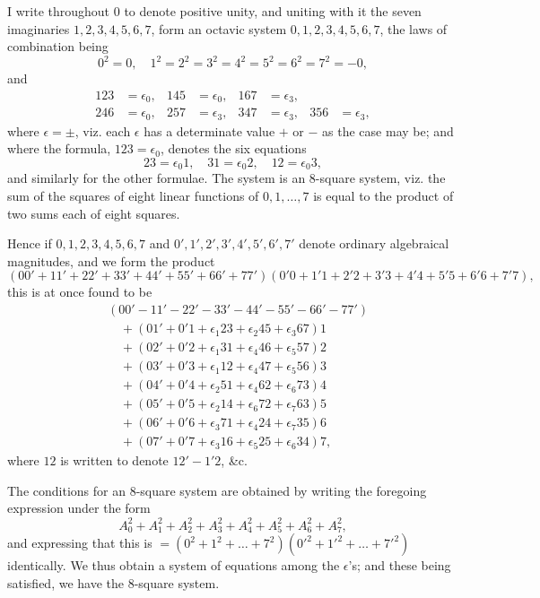 \documentclass[11pt,a4paper]{article}
\theoremstyle{definition}
\begin{document}
I write throughout $0$ to denote positive unity, and uniting with it the seven imaginaries $1, 2, 3, 4, 5, 6, 7$, form an octavic system $0, 1, 2, 3, 4, 5, 6, 7$, the laws of combination being
\[
0^2 = 0,\quad 1^2 = 2^2 = 3^2 = 4^2 = 5^2 = 6^2 = 7^2 = -0,
\]
and
\[
\begin{aligned}
123 &= \epsilon_0, & 145 &= \epsilon_0, & 167 &= \epsilon_3,\\
246 &= \epsilon_0, & 257 &= \epsilon_3, & 347 &= \epsilon_3, & 356 &= \epsilon_3,
\end{aligned}
\]
where $\epsilon = \pm$, viz. each $\epsilon$ has a determinate value $+$ or $-$ as the case may be; and where the formula, $123 = \epsilon_0$, denotes the six equations
\[
23 = \epsilon_0 1,\quad 31 = \epsilon_0 2,\quad 12 = \epsilon_0 3,
\]
and similarly for the other formulae. The system is an 8-square system, viz. the sum of the squares of eight linear functions of $0, 1, \dots, 7$ is equal to the product of two sums each of eight squares.

Hence if $0, 1, 2, 3, 4, 5, 6, 7$ and $0', 1', 2', 3', 4', 5', 6', 7'$ denote ordinary algebraical magnitudes, and we form the product
\[
(00' + 11' + 22' + 33' + 44' + 55' + 66' + 77')(0'0 + 1'1 + 2'2 + 3'3 + 4'4 + 5'5 + 6'6 + 7'7),
\]
this is at once found to be
\[
\begin{aligned}
&(00' - 11' - 22' - 33' - 44' - 55' - 66' - 77')\\
&\quad + (01' + 0'1 + \epsilon_1 23 + \epsilon_2 45 + \epsilon_3 67)1\\
&\quad + (02' + 0'2 + \epsilon_1 31 + \epsilon_4 46 + \epsilon_5 57)2\\
&\quad + (03' + 0'3 + \epsilon_1 12 + \epsilon_4 47 + \epsilon_5 56)3\\
&\quad + (04' + 0'4 + \epsilon_2 51 + \epsilon_4 62 + \epsilon_6 73)4\\
&\quad + (05' + 0'5 + \epsilon_2 14 + \epsilon_6 72 + \epsilon_7 63)5\\
&\quad + (06' + 0'6 + \epsilon_3 71 + \epsilon_4 24 + \epsilon_7 35)6\\
&\quad + (07' + 0'7 + \epsilon_3 16 + \epsilon_5 25 + \epsilon_6 34)7,
\end{aligned}
\]
where $12$ is written to denote $12' - 1'2$, \&c.

The conditions for an 8-square system are obtained by writing the foregoing expression under the form
\[
A_0^2 + A_1^2 + A_2^2 + A_3^2 + A_4^2 + A_5^2 + A_6^2 + A_7^2,
\]
and expressing that this is $= (0^2 + 1^2 + \dots + 7^2)(0'^2 + 1'^2 + \dots + 7'^2)$ identically. We thus obtain a system of equations among the $\epsilon$'s; and these being satisfied, we have the 8-square system.
\end{document}
